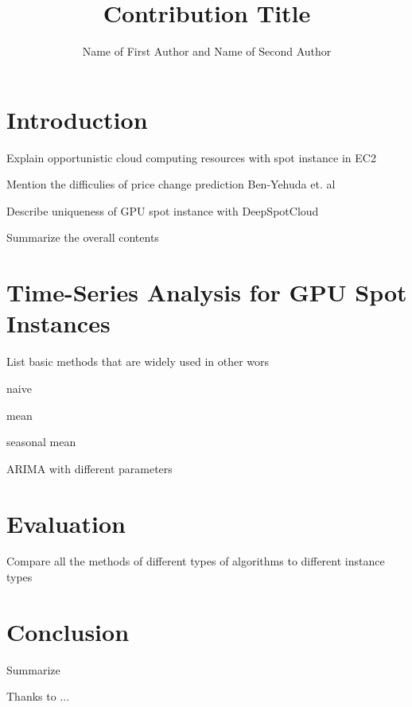 \documentclass[graybox]{svmult}
\begin{document}
\title*{Contribution Title}
\author{Name of First Author and Name of Second Author}
%
%
\maketitle

\section{Introduction}\label{sec:1}
Explain opportunistic cloud computing resources with spot instance in EC2

Mention the difficulies of price change prediction
Ben-Yehuda et. al~\cite{spot-instance-pricing-analysis}

Describe uniqueness of GPU spot instance with DeepSpotCloud

Summarize the overall contents

\section{Time-Series Analysis for GPU Spot Instances}
List basic methods that are widely used in other wors

naive

mean

seasonal mean

ARIMA with different parameters

\section{Evaluation}
Compare all the methods of different types of algorithms to different instance types

\section{Conclusion}
Summarize

\begin{acknowledgement}
Thanks to ...
\end{acknowledgement}


\end{document}
